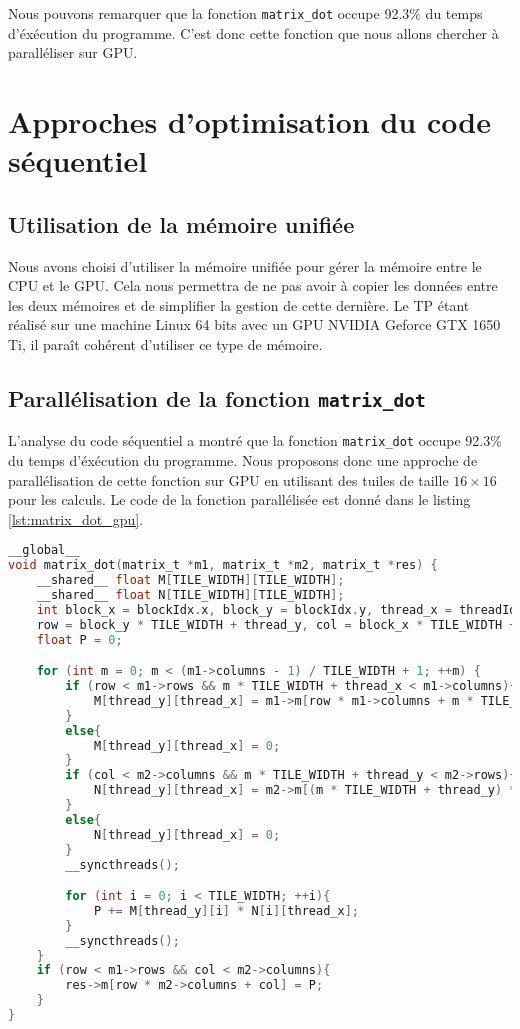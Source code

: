 \documentclass[12pt, a4paper]{article}
\begin{document}
Nous pouvons remarquer que la fonction \texttt{matrix\_dot} occupe 92.3\% du temps d'éxécution du programme. C'est donc cette fonction que nous allons chercher à paralléliser sur GPU.

\section{Approches d'optimisation du code séquentiel}
\subsection{Utilisation de la mémoire unifiée}

Nous avons choisi d'utiliser la mémoire unifiée pour gérer la mémoire entre le CPU et le GPU. Cela nous permettra de ne pas avoir à copier les données entre les deux mémoires et de simplifier la gestion de cette dernière. Le TP étant réalisé sur une machine Linux 64 bits avec un GPU NVIDIA Geforce GTX 1650 Ti, il paraît cohérent d'utiliser ce type de mémoire.

\subsection{Parallélisation de la fonction \texttt{matrix\_dot}}

L'analyse du code séquentiel a montré que la fonction \texttt{matrix\_dot} occupe 92.3\% du temps d'éxécution du programme. Nous proposons donc une approche de parallélisation de cette fonction sur GPU en utilisant des tuiles de taille $16 \times 16$ pour les calculs. Le code de la fonction parallélisée est donné dans le listing \ref{lst:matrix_dot_gpu}.

\begin{lstlisting}[language=c, caption={Parallélisation de \texttt{matrix\_dot} sur GPU}, label={lst:matrix_dot_gpu}, basicstyle=\scriptsize,]
__global__
void matrix_dot(matrix_t *m1, matrix_t *m2, matrix_t *res) {
    __shared__ float M[TILE_WIDTH][TILE_WIDTH];
    __shared__ float N[TILE_WIDTH][TILE_WIDTH];
    int block_x = blockIdx.x, block_y = blockIdx.y, thread_x = threadIdx.x, thread_y = threadIdx.y,
    row = block_y * TILE_WIDTH + thread_y, col = block_x * TILE_WIDTH + thread_x;
    float P = 0;

    for (int m = 0; m < (m1->columns - 1) / TILE_WIDTH + 1; ++m) {
        if (row < m1->rows && m * TILE_WIDTH + thread_x < m1->columns){
            M[thread_y][thread_x] = m1->m[row * m1->columns + m * TILE_WIDTH + thread_x];
        }
        else{
            M[thread_y][thread_x] = 0;
        }
        if (col < m2->columns && m * TILE_WIDTH + thread_y < m2->rows){
            N[thread_y][thread_x] = m2->m[(m * TILE_WIDTH + thread_y) * m2->columns + col];
        }
        else{
            N[thread_y][thread_x] = 0;
        }
        __syncthreads();

        for (int i = 0; i < TILE_WIDTH; ++i){
            P += M[thread_y][i] * N[i][thread_x];
        }
        __syncthreads();
    }
    if (row < m1->rows && col < m2->columns){
        res->m[row * m2->columns + col] = P;
    }
}
\end{lstlisting}
\end{document}
